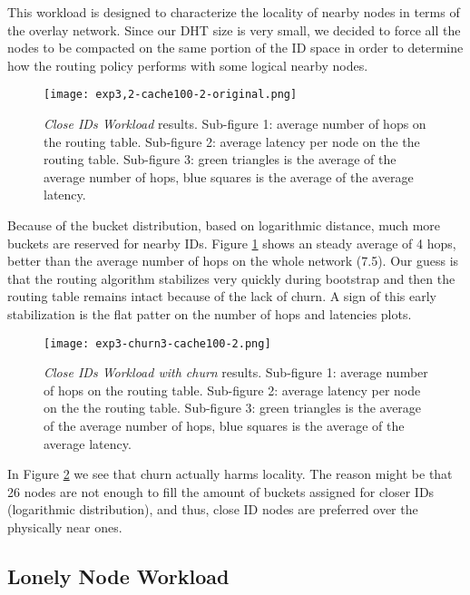 \documentclass[conference]{IEEEtran}
\begin{document}
This workload is designed to characterize the locality of nearby nodes in terms of the overlay network. Since our DHT size is very small, we decided to force all the nodes to be compacted on the same portion of the ID space in order to determine how the routing policy performs with some logical nearby nodes.

\begin{figure}
    \texttt{[image: exp3,2-cache100-2-original.png]}
    \caption{\textit{Close IDs Workload} results. Sub-figure 1: average number of hops on the routing table. Sub-figure 2: average latency per node on the the routing table. Sub-figure 3: green triangles is the average of the average number of hops, blue squares is the average of the average latency.}
    \label{fig:exp3,2-cache100-2-original}
\end{figure}

Because of the bucket distribution, based on logarithmic distance, much more buckets are reserved for nearby IDs. Figure \ref{fig:exp3,2-cache100-2-original} shows an steady average of 4 hops, better than the average number of hops on the whole network (7.5). Our guess is that the routing algorithm stabilizes very quickly during bootstrap and then the routing table remains intact because of the lack of churn. A sign of this early stabilization is the flat patter on the number of hops and latencies plots.

\begin{figure}
    \texttt{[image: exp3-churn3-cache100-2.png]}
    \caption{\textit{Close IDs Workload with churn} results. Sub-figure 1: average number of hops on the routing table. Sub-figure 2: average latency per node on the the routing table. Sub-figure 3: green triangles is the average of the average number of hops, blue squares is the average of the average latency.}
    \label{fig:exp3-churn3-cache100-2}
\end{figure}

In Figure \ref{fig:exp3-churn3-cache100-2} we see that churn actually harms locality. The reason might be that 26 nodes are not enough to fill the amount of buckets assigned for closer IDs (logarithmic distribution), and thus, close ID nodes are preferred over the physically near ones.


\subsection{Lonely Node Workload}
\end{document}
